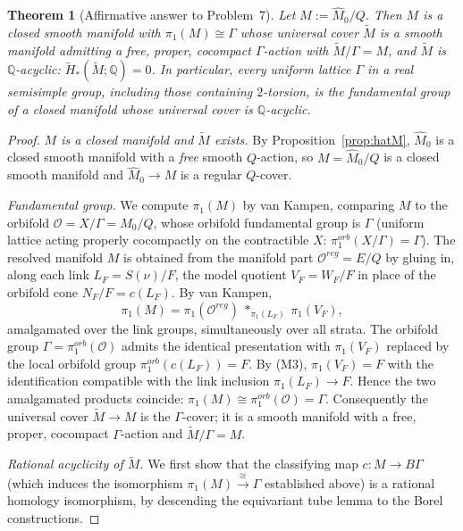 \documentclass[12pt]{article}
\newtheorem{theorem}{Theorem}
\theoremstyle{definition}
\begin{document}
\begin{theorem}[Affirmative answer to Problem~7]\label{thm:main}
Let $M:=\widehat M_0/Q$. Then $M$ is a closed smooth manifold with
$\pi_1(M)\cong\Gamma$ whose universal cover $\widetilde M$ is a smooth manifold
admitting a free, proper, cocompact $\Gamma$-action with $\widetilde M/\Gamma=M$,
and $\widetilde M$ is $\mathbb{Q}$-acyclic:
$\widetilde H_*(\widetilde M;\mathbb{Q})=0$. In particular, every uniform
lattice $\Gamma$ in a real semisimple group, including those containing
$2$-torsion, \emph{is} the fundamental group of a closed manifold whose
universal cover is $\mathbb{Q}$-acyclic.
\end{theorem}
\begin{proof}
\emph{$M$ is a closed manifold and $\widetilde M$ exists.} By
Proposition~\ref{prop:hatM}, $\widehat M_0$ is a closed smooth manifold with a
\emph{free} smooth $Q$-action, so $M=\widehat M_0/Q$ is a closed smooth
manifold and $\widehat M_0\to M$ is a regular $Q$-cover.

\emph{Fundamental group.} We compute $\pi_1(M)$ by van Kampen, comparing $M$ to
the orbifold $\mathcal O=X/\Gamma=M_0/Q$, whose orbifold fundamental group is
$\Gamma$ (uniform lattice acting properly cocompactly on the contractible $X$:
$\pi_1^{orb}(X/\Gamma)=\Gamma$). The resolved manifold $M$ is obtained from the
manifold part $\mathcal O^{reg}=E/Q$ by gluing in, along each link
$L_F=S(\nu)/F$, the model quotient $V_F=W_F/F$ in place of the orbifold cone
$N_F/F=c(L_F)$. By van Kampen,
\[
   \pi_1(M)=\pi_1(\mathcal O^{reg})\ \ast_{\pi_1(L_F)}\ \pi_1(V_F),
\]
amalgamated over the link groups, simultaneously over all strata. The orbifold
group $\Gamma=\pi_1^{orb}(\mathcal O)$ admits the identical presentation with
$\pi_1(V_F)$ replaced by the local orbifold group $\pi_1^{orb}(c(L_F))=F$. By
(M3), $\pi_1(V_F)=F$ with the identification compatible with the link inclusion
$\pi_1(L_F)\to F$. Hence the two amalgamated products coincide:
$\pi_1(M)\cong\pi_1^{orb}(\mathcal O)=\Gamma$. Consequently the universal cover
$\widetilde M\to M$ is the $\Gamma$-cover; it is a smooth manifold with a free,
proper, cocompact $\Gamma$-action and $\widetilde M/\Gamma=M$.

\emph{Rational acyclicity of $\widetilde M$.} We first show that the
classifying map $c\colon M\to B\Gamma$ (which induces the isomorphism
$\pi_1(M)\xrightarrow{\cong}\Gamma$ established above) is a rational homology
isomorphism, by descending the equivariant tube lemma to the Borel
constructions.


\end{proof}
\end{document}
